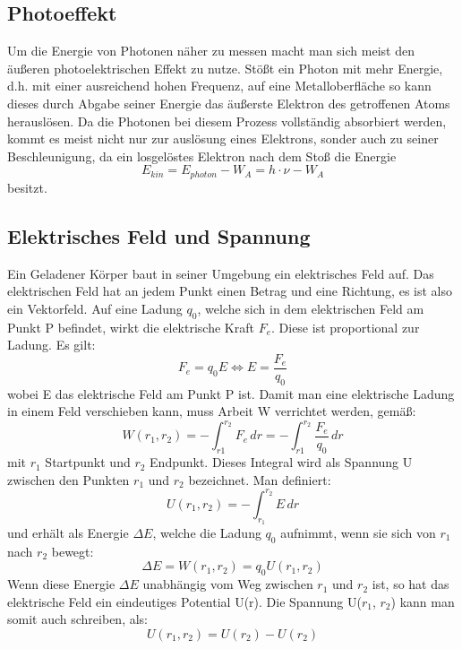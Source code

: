 \documentclass{scrartcl}
\begin{document}
	\subsection{Photoeffekt}
		Um die Energie von Photonen näher zu messen macht man sich meist den äußeren photoelektrischen Effekt zu
		nutze. Stößt ein Photon mit mehr Energie, d.h. mit einer ausreichend hohen Frequenz, auf eine Metalloberfläche
		so kann dieses durch Abgabe seiner Energie das äußerste Elektron des getroffenen Atoms herauslösen. Da die Photonen
		bei diesem Prozess vollständig absorbiert werden, kommt es meist nicht nur zur auslösung eines Elektrons, sonder 
		auch zu seiner Beschleunigung, da ein losgelöstes Elektron nach dem Stoß die Energie
		\begin{equation}
			E_{kin} = E_{photon} - W_A = h\cdot \nu - W_A
		\end{equation} 
		besitzt.
	\subsection{Elektrisches Feld und Spannung}
		Ein Geladener Körper baut in seiner Umgebung ein elektrisches Feld auf. Das elektrischen Feld hat an jedem Punkt einen Betrag und eine Richtung, es ist also ein	Vektorfeld. Auf eine Ladung $q_{0}$, welche sich in dem elektrischen Feld am Punkt P befindet, wirkt die elektrische Kraft $F_{e}$. Diese ist proportional zur Ladung. Es gilt:
		\begin{equation}
			F_{e} = q_{0} E   \Leftrightarrow   E = \frac{F_{e}}{q_{0}}
		\end{equation}
		wobei E das elektrische Feld am Punkt P ist. 
		Damit man eine elektrische Ladung in einem Feld verschieben kann, muss Arbeit W verrichtet werden, gemäß:
		\begin{equation}
			W(r_{1}, r_{2}) = - \int_{r{1}}^{r_{2}} F_{e}  \,dr = - \int_{r{1}}^{r_{2}} \frac{F_{e}}{q_{0}} \,dr
		\end{equation}
		mit $r_{1}$ Startpunkt und $r_{2}$ Endpunkt. 
		Dieses Integral wird als Spannung U zwischen den Punkten $r_{1}$ und $r_{2}$ bezeichnet. Man definiert:
		\begin{equation}
			U(r_{1}, r_{2}) = - \int_{r_{1}}^{r_{2}} E \,dr
		\end{equation}
		und erhält als Energie $\Delta E$, welche die Ladung $q_0$ aufnimmt, wenn sie sich von $r_{1}$ nach $r_{2}$ bewegt:
		\begin{equation}
			\Delta E = W(r_{1}, r_{2}) = q_{0} U(r_{1}, r_{2})
		\end{equation}
		Wenn diese Energie $\Delta E$ unabhängig vom Weg zwischen $r_{1}$ und $r_{2}$ ist, so hat das elektrische Feld ein eindeutiges Potential U(r). Die Spannung U($r_{1}$, $r_{2}$) kann man somit auch schreiben, als:
		\begin{equation}
			U(r_{1}, r_{2}) = U(r_{2}) - U(r_{2})
		\end{equation}
\end{document}

